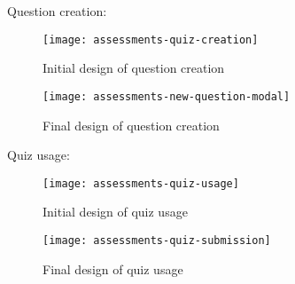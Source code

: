 \newpage
Question creation:

\begin{figure}[h!]
	\centering
	\texttt{[image: assessments-quiz-creation]}
	\caption{Initial design of question creation}
\end{figure}

\begin{figure}[h!]
	\centering
	\texttt{[image: assessments-new-question-modal]}
	\caption{Final design of question creation}
\end{figure}

\newpage

Quiz usage:

\begin{figure}[h!]
	\centering
	\texttt{[image: assessments-quiz-usage]}
	\caption{Initial design of quiz usage}
\end{figure}

\begin{figure}[h!]
	\centering
	\texttt{[image: assessments-quiz-submission]}
	\caption{Final design of quiz usage}
\end{figure}

\newpage